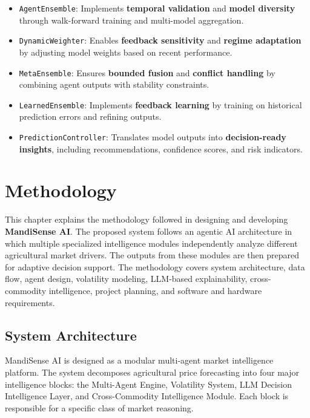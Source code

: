 \documentclass[12pt,a4paper]{report}
\begin{document}
\vspace{0.3em}

\begin{itemize}
    \item \texttt{AgentEnsemble}: Implements \textbf{temporal validation} and \textbf{model diversity} through walk-forward training and multi-model aggregation.

    \item \texttt{DynamicWeighter}: Enables \textbf{feedback sensitivity} and \textbf{regime adaptation} by adjusting model weights based on recent performance.

    \item \texttt{MetaEnsemble}: Ensures \textbf{bounded fusion} and \textbf{conflict handling} by combining agent outputs with stability constraints.

    \item \texttt{LearnedEnsemble}: Implements \textbf{feedback learning} by training on historical prediction errors and refining outputs.

    \item \texttt{PredictionController}: Translates model outputs into \textbf{decision-ready insights}, including recommendations, confidence scores, and risk indicators.
\end{itemize}
\chapter{Methodology}

This chapter explains the methodology followed in designing and developing \textbf{MandiSense AI}. The proposed system follows an agentic AI architecture in which multiple specialized intelligence modules independently analyze different agricultural market drivers. The outputs from these modules are then prepared for adaptive decision support. The methodology covers system architecture, data flow, agent design, volatility modeling, LLM-based explainability, cross-commodity intelligence, project planning, and software and hardware requirements.

\section{System Architecture}

MandiSense AI is designed as a modular multi-agent market intelligence platform. The system decomposes agricultural price forecasting into four major intelligence blocks: the Multi-Agent Engine, Volatility System, LLM Decision Intelligence Layer, and Cross-Commodity Intelligence Module. Each block is responsible for a specific class of market reasoning.
\end{document}
